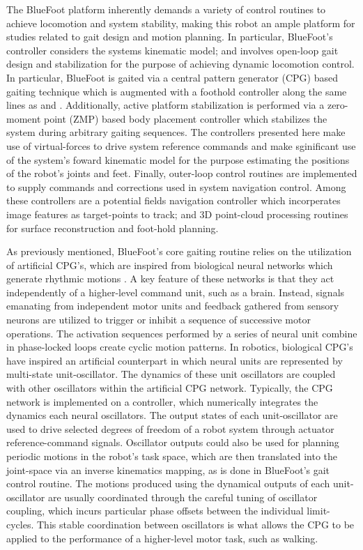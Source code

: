 		The BlueFoot platform inherently demands a variety of control routines to achieve locomotion and system stability, making this robot an ample platform for studies related to gait design and motion planning. In particular, BlueFoot's controller considers the systems kinematic model; and involves open-loop gait design and stabilization for the purpose of achieving dynamic locomotion control. In particular, BlueFoot is gaited via a central pattern generator (CPG) based gaiting technique which is augmented with a foothold controller along the same lines as \cite{Ajallooeian2013} and \cite{Rutishauser2008}. Additionally, active platform stabilization is performed via a zero-moment point (ZMP) based body placement controller which stabilizes the system during arbitrary gaiting sequences. The controllers presented here make use of virtual-forces to drive system reference commands and make sginificant use of the system's foward kinematic model for the purpose estimating the positions of the robot's joints and feet. Finally, outer-loop control routines are implemented to supply commands and corrections used in system navigation control. Among these controllers are a potential fields navigation controller which incorperates image features as target-points to track; and 3D point-cloud processing routines for surface reconstruction and foot-hold planning.

		As previously mentioned, BlueFoot's core gaiting routine relies on the utilization of artificial CPG's, which are inspired from biological neural networks which generate rhythmic motions \cite{Ijspeert2008}. A key feature of these networks is that they act independently of a higher-level command unit, such as a brain. Instead, signals emanating from independent motor units and feedback gathered from sensory neurons are utilized to trigger or inhibit a sequence of successive motor operations. The activation sequences performed by a series of neural unit combine in phase-locked loops create cyclic motion patterns. In robotics, biological CPG's have inspired an artificial counterpart in which neural units are represented by multi-state unit-oscillator. The dynamics of these unit oscillators are coupled with other oscillators within the artificial CPG network. Typically, the CPG network is implemented on a controller, which numerically integrates the dynamics each neural oscillators. The output states of each unit-oscillator are used to drive selected degrees of freedom of a robot system through actuator reference-command signals. Oscillator outputs could also be used for planning periodic motions in the robot's task space, which are then translated into the joint-space via an inverse kinematics mapping, as is done in BlueFoot's gait control routine. The motions produced using the dynamical outputs of each unit-oscillator are usually coordinated through the careful tuning of oscillator coupling, which incurs particular phase offsets between the individual limit-cycles. This stable coordination between oscillators is what allows the CPG to be applied to the performance of a higher-level motor task, such as walking.

